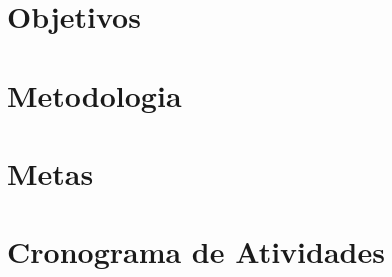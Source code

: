 \section{Objetivos}%
\label{sec:obj}
%

\section{Metodologia}
\label{sec:metod}
%

\section{Metas}
\label{sec:metas}
%

\section{Cronograma de Atividades}
\label{sec:cronos}
%

%


\printbibliography

%

%

%

%


